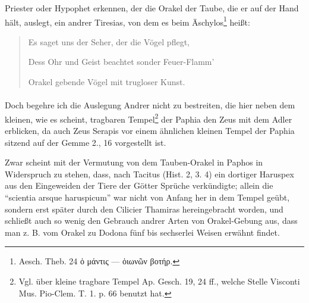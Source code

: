 \documentclass[a4paper, 11pt, oneside, polutonikogreek, german]{article}
\begin{document}
Priester oder Hypophet erkennen, der die Orakel der Taube, die er auf der Hand hält, auslegt, ein andrer Tiresias, von dem es beim Äschylos\footnote{Aesch. Theb. 24 ὁ μάντις --- ὀιωνῶν βοτήρ.} heißt:
\begin{quotation}
Es saget uns der Seher, der die Vögel pflegt,  

Dess Ohr und Geist beachtet sonder Feuer-Flamm'

Orakel gebende Vögel mit trugloser Kunst.
\end{quotation}
\paragraph{}
Doch begehre ich die Auslegung Andrer nicht zu bestreiten, die hier neben dem kleinen, wie es scheint, tragbaren Tempel\footnote{Vgl. über kleine tragbare Tempel Ap. Gesch. 19, 24 ff., welche Stelle Visconti Mus. Pio-Clem. T. 1. p. 66 benutzt hat.} der Paphia den Zeus mit dem Adler erblicken, da auch Zeus Serapis vor einem ähnlichen kleinen Tempel der Paphia sitzend auf der Gemme 2., 16 vorgestellt ist.

Zwar scheint mit der Vermutung von dem Tauben-Orakel in Paphos in Widerspruch zu stehen, dass, nach Tacitus (Hist. 2, 3. 4) ein dortiger Haruspex aus den Eingeweiden der Tiere der Götter Sprüche verkündigte; allein die "`scientia arsque haruspicum"' war nicht von Anfang her in dem Tempel geübt, sondern erst später durch den Cilicier Thamiras hereingebracht worden, und schließt auch so wenig den Gebrauch andrer Arten von Orakel-Gebung aus, dass man z. B. vom Orakel zu Dodona fünf bis sechserlei Weisen erwähnt findet.
\end{document}
